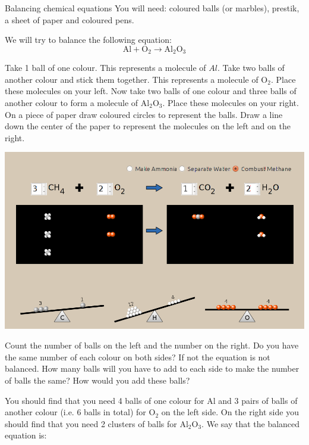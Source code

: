            \begin{activity}{Balancing chemical equations}
            \nopagebreak
            \label{m38726*eip-695}You will need: coloured balls (or marbles), prestik, a sheet of paper and coloured pens.
\par 
\label{m38726*eip-69823}We will try to balance the following equation:
\label{m38726*eid0342}\nopagebreak\noindent{}
    \begin{equation*}
    \mathrm{Al}+{\mathrm{O}}_{2}\to {\mathrm{Al}}_{2}{\mathrm{O}}_{3}\tag{13.4}
      \end{equation*}
\begin{minipage}{.5\textwidth}
Take 1 ball of one colour. This represents a molecule of $Al$. Take two balls of another colour and stick them together. This represents a molecule of ${\mathrm{O}}_{2}$. Place these molecules on your left. Now take two balls of one colour and three balls of another colour to form a molecule of ${\mathrm{Al}}_{2}{\mathrm{O}}_{3}$. Place these molecules on your right. On a piece of paper draw coloured circles to represent the balls. Draw a line down the center of the paper to represent the molecules on the left and on the right. 
\par 
 
\end{minipage}
\begin{minipage}{.5\textwidth}
 \begin{center}
\includegraphics[width=.8\textwidth]{photos/BalancingChemEqu.png}\par
 \end{center}

\end{minipage}
\label{m38726*id23534}
Count the number of balls on the left and the number on the right. Do you have the same number of each colour on both sides? If not the equation is not balanced. How many balls will you have to add to each side to make the number of balls the same? How would you add these balls?
\par
\label{m38726*id09873432}You should find that you need 4 balls of one colour for $\mathrm{Al}$ and 3 pairs of balls of another colour (i.e. 6 balls in total) for ${\mathrm{O}}_{2}$ on the left side. On the right side you should find that you need 2 clusters of balls for ${\mathrm{Al}}_{2}{\mathrm{O}}_{3}$.
We say that the balanced equation is:
\label{m38726*id97235}\nopagebreak\noindent{}


\end{activity}
